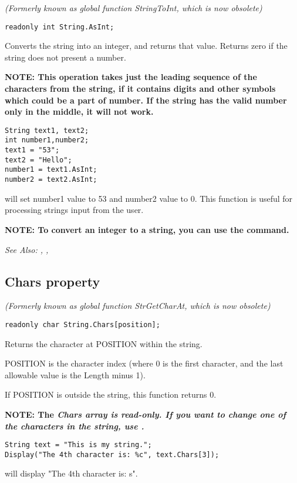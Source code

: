 \it{(Formerly known as global function StringToInt, which is now obsolete)}

\begin{verbatim}
readonly int String.AsInt;
\end{verbatim}
Converts the string into an integer, and returns that value. Returns
zero if the string does not present a number.

\bf{NOTE:} This operation takes just the leading sequence of the characters from the string,
if it contains digits and other symbols which could be a part of number. If the string has the
valid number only in the middle, it will not work.

\begin{verbatim}
String text1, text2;
int number1,number2;
text1 = "53";
text2 = "Hello";
number1 = text1.AsInt;
number2 = text2.AsInt;
\end{verbatim}
will set number1 value to 53 and number2 value to 0.
This function is useful for processing strings input from the user.

\bf{NOTE:} To convert an integer to a string, you can use the 
command.

\it{See Also:} , ,


\subsection{Chars property}\label{String.Chars}%

\it{(Formerly known as global function StrGetCharAt, which is now obsolete)}

\begin{verbatim}
readonly char String.Chars[position];
\end{verbatim}
Returns the character at POSITION within the string.

POSITION is the character index (where 0 is the first character, and the last
allowable value is the Length minus 1).

If POSITION is outside the string, this function returns 0.

\bf{NOTE:} The \it{Chars} array is read-only. If you want to change one of the characters
in the string, use .

\begin{verbatim}
String text = "This is my string.";
Display("The 4th character is: %c", text.Chars[3]);
\end{verbatim}
will display "The 4th character is: s".

